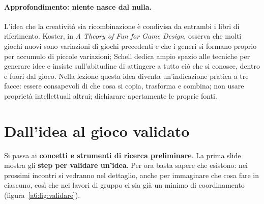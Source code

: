 \paragraph{Approfondimento: niente nasce dal nulla.} L'idea che la creatività sia
ricombinazione è condivisa da entrambi i libri di riferimento. Koster, in \emph{A
Theory of Fun for Game Design}, osserva che molti giochi nuovi sono variazioni di
giochi precedenti e che i generi si formano proprio per accumulo di piccole
variazioni; Schell dedica ampio spazio alle tecniche per generare idee e insiste
sull'abitudine di attingere a tutto ciò che si conosce, dentro e fuori dal gioco.
Nella lezione questa idea diventa un'indicazione pratica a tre facce: essere
consapevoli di che cosa si copia, trasforma e combina; non usare proprietà
intellettuali altrui; dichiarare apertamente le proprie fonti.

\section{Dall'idea al gioco validato}
\label{a6:sec:validare}



Si passa ai \textbf{concetti e strumenti di ricerca preliminare}. La prima slide
mostra gli \textbf{step per validare un'idea}. Per ora basta sapere che esistono:
nei prossimi incontri si vedranno nel dettaglio, anche per immaginare che cosa fare in
ciascuno, così che nei lavori di gruppo ci sia già un minimo di coordinamento
(figura~\ref{a6:fig:validare}).

